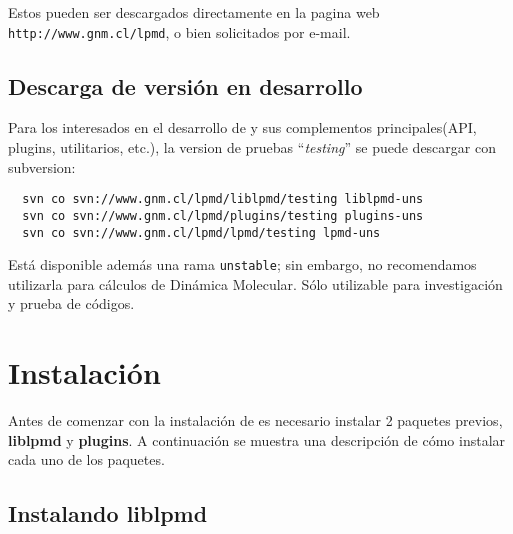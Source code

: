Estos pueden ser descargados directamente en la pagina web \texttt{http://www.gnm.cl/lpmd}, o bien solicitados por e-mail.

\subsection{Descarga de versi\'on en desarrollo}

Para los interesados en el desarrollo de \lpmd y sus complementos principales(API, plugins, utilitarios, etc.), la version de pruebas ``\textit{testing}'' se puede descargar con subversion:

\begin{center}
 \begin{verbatim}
  svn co svn://www.gnm.cl/lpmd/liblpmd/testing liblpmd-uns
  svn co svn://www.gnm.cl/lpmd/plugins/testing plugins-uns
  svn co svn://www.gnm.cl/lpmd/lpmd/testing lpmd-uns
 \end{verbatim}
\end{center}

Est\'a disponible adem\'as una rama \verb|unstable|; sin embargo, no recomendamos utilizarla para c\'alculos de Din\'amica Molecular. S\'olo utilizable para investigaci\'on y prueba de c\'odigos.

\section{Instalaci\'on}
Antes de comenzar con la instalaci\'on de \lpmd es necesario instalar 2 paquetes previos, \textbf{liblpmd} y \textbf{plugins}. A continuaci\'on se muestra una descripci\'on de c\'omo instalar cada uno de los paquetes.


\subsection{Instalando liblpmd}

% 
% 

